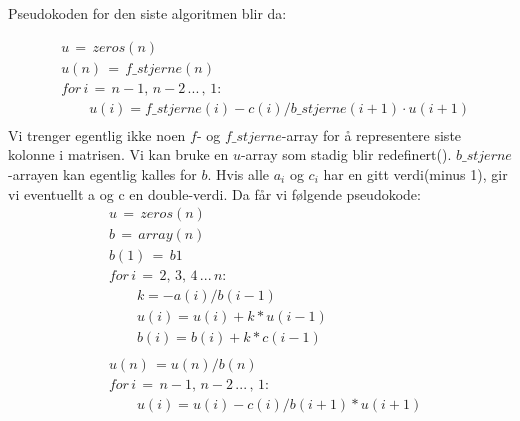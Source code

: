\documentclass[a4paper,10pt,norsk]{article}
\begin{document}
Pseudokoden for den siste algoritmen blir da:

\begin{align*}
&u\,=\,zeros(n)\\
&u(n)\,=\,f\_stjerne(n)\\
&for\, i\,=\, n-1,\, n-2 \, ...\, ,\, 1:\\
&\quad\quad u(i)=f\_stjerne(i) -c(i)/b\_stjerne(i+1) \cdot u(i+1)\\
\end{align*}
Vi trenger egentlig ikke noen $f$- og $f\_stjerne$-array for å representere siste kolonne i matrisen. Vi kan bruke en $u$-array som stadig blir redefinert(). $b\_stjerne$-arrayen kan egentlig kalles for $b$. Hvis alle $a_i$ og $c_i$ har en gitt verdi(minus 1), gir vi eventuellt a og c en double-verdi. Da får vi følgende pseudokode: 
\begin{align*}
&u\,=\,zeros(n)\\
&b\, =\, array(n)\\
&b(1)\, =\, b1\\
&for\, i\,=\,2,\, 3,\, 4 \, ...\,  n:\\
&\quad\quad k=-a(i)/b(i-1)\\
&\quad\quad u(i)= u(i)+k* u(i-1)\\
&\quad\quad b(i)= b(i)+k*c(i-1)\\
\\
&u(n)\,=u(n)/b(n)\\
&for\, i\,=\, n-1,\, n-2 \, ...\, ,\, 1:\\
&\quad\quad u(i)=u(i) -c(i)/b(i+1) * u(i+1)\\
\end{align*}
\end{document}
